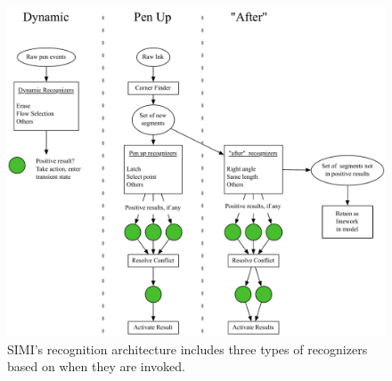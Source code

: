\begin{figure}[t]
  \centering
  \includegraphics[width=\linewidth]{img/recognition-architecture.pdf}
  \caption[SIMI Recognition Architecture]{SIMI's recognition
    architecture includes three types of recognizers based on when
    they are invoked.}
  \label{fig:recog-arch}
\end{figure}
